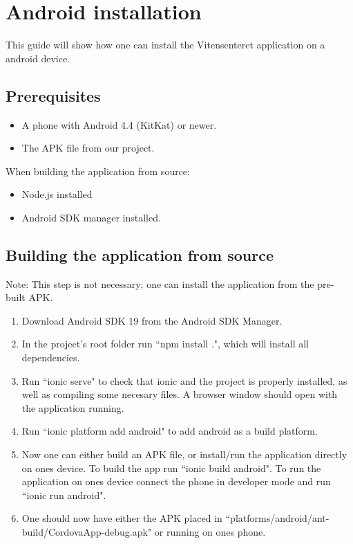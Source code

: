 
\section{Android installation}
This guide will show how one can install the Vitensenteret application on a android device.

\subsection{Prerequisites}
\begin{itemize}
    \item A phone with Android 4.4 (KitKat) or newer.
    \item The APK file from our project.
\end{itemize}

When building the application from source:
\begin{itemize}
    \item Node.js installed
    \item Android SDK manager installed.
\end{itemize}



\subsection{Building the application from source}
Note: This step is not necessary; one can install the application from the pre-built APK.
\begin{enumerate}
    \item Download Android SDK 19 from the Android SDK Manager.
    \item In the project's root folder run ``npm install .", which will install all dependencies.
    \item Run ``ionic serve" to check that ionic and the project is properly installed, as well as compiling some necesary files. A browser window should open with the application running.
    \item Run ``ionic platform add android" to add android as a build platform.
    \item Now one can either build an APK file, or install/run the application directly on ones device. To build the app run ``ionic build android". To run the application on ones device connect the phone in developer mode and run ``ionic run android".
    \item One should now have either the APK placed in ``platforms/android/ant-build/CordovaApp-debug.apk" or running on ones phone.
\end{enumerate}


